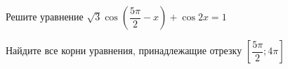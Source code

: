 \begin{ex}
	\begin{condition}
		\begin{enumcols}[label=\asbuk*)]
			\item Решите уравнение \( \sqrt{3} \cos{\left(\dfrac{5\pi}{2}-x\right)} + \cos 2x = 1 \)
			\item Найдите все корни уравнения, принадлежащие отрезку \( \left[\dfrac{5\pi}{2};4\pi\right] \)
		\end{enumcols}
	\end{condition}
\end{ex}